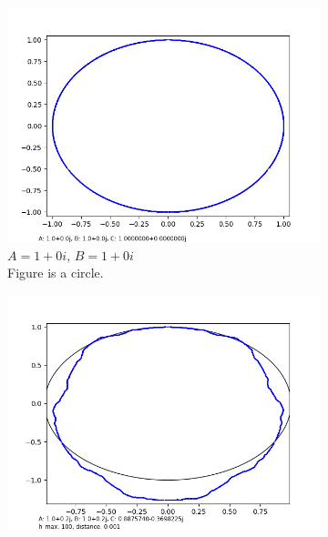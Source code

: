 \documentclass[12pt,a4paper,reqno,parskip=full]{amsart}
\numberwithin{equation}{section}
\theoremstyle{plain}
\theoremstyle{definition}
\begin{document}
\begin{figure}[H]
     \centering
     
     \begin{subfigure}[b]{0.4\textwidth}
         \centering
         \includegraphics[width=\textwidth]{images/nn/a0 b0 h100 d0.001 auto xy.png}
         \caption{$A=1+0i$, $B=1+0i$\\Figure is a circle.}
         \label{fig:circle}
     \end{subfigure}
     \hfill
     \begin{subfigure}[b]{0.4\textwidth}
         \centering
         \includegraphics[width=\textwidth]{images/m/a.2,b.2,h100,d.0010.png}

\end{subfigure}
\end{figure}
\end{document}
